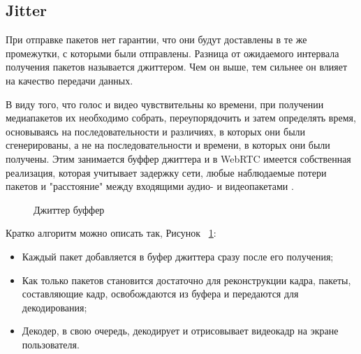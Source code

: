 \subsection{Jitter}

При отправке пакетов нет гарантии, что они будут доставлены в те же промежутки, с которыми были отправлены. Разница от ожидаемого интервала получения пакетов называется джиттером. Чем он выше, тем сильнее он влияет на качество передачи данных.

В виду того, что голос и видео чувствительны ко времени, при получении медиапакетов их необходимо собрать, переупорядочить и затем определять время, основываясь на последовательности и различиях, в которых они были сгенерированы, а не на последовательности и времени, в которых они были получены. Этим занимается буффер джиттера и в WebRTC имеется собственная реализация, которая учитывает задержку сети, любые наблюдаемые потери пакетов и "расстояние" между входящими аудио- и видеопакетами \cite{v12}.

\begin{figure}[ht]
\begin{center}

\caption{
\label{jitter-buffer}
     Джиттер буффер}
\end {center}
\end {figure}

Кратко алгоритм можно описать так, Рисунок ~\ref{jitter-buffer}:
\begin{itemize}
	\item[1.] Каждый пакет добавляется в буфер джиттера сразу после его получения;
	\item[2.] Как только пакетов становится достаточно для реконструкции кадра, пакеты, составляющие кадр, освобождаются из буфера и передаются для декодирования;
        \item[3.] Декодер, в свою очередь, декодирует и отрисовывает видеокадр на экране пользователя.
\end{itemize}

